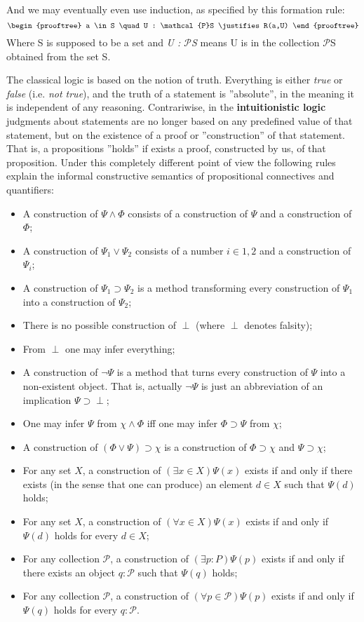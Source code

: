 And we may eventually even use induction, as specified by this formation rule:
\[
	\begin{prooftree}
		a \in S \quad
		U : \mathcal{P}S
		\justifies
		R(a,U)
	\end{prooftree}
\]
Where S is supposed to be a set and \textit{U : $\mathcal{P}$S} means U is in the collection $\mathcal{P}$S obtained from the set S.

The classical logic is based on the notion of truth. Everything is either \textit{true} or \textit{false} (i.e. \textit{not true}), and the truth of a statement is ''absolute'', in the meaning it is independent of any reasoning. Contrariwise, in the \textbf{intuitionistic logic} judgments about statements are no longer based on any predefined value of that statement, but on the existence of a proof or ''construction'' of that statement. That is, a propositions ''holds'' if exists a proof, constructed by us, of that proposition. Under this completely different point of view the following rules explain the informal constructive semantics of propositional connectives and quantifiers:
\begin{itemize}
	\item A construction of $\Psi\wedge\Phi$ consists of a construction of $\Psi$ and a construction of $\Phi$;
	\item A construction of $\Psi_{1} \vee \Psi_{2}$ consists of a number $i \in {1, 2}$ and a construction of $\Psi_{i}$;
	\item A construction of $\Psi_{1} \supset \Psi_{2}$ is a method transforming every construction of $\Psi_{1}$ into a construction of $\Psi_{2}$;
	\item There is no possible construction of $\perp$ (where $\perp$ denotes falsity);
	\item From $\perp$ one may infer everything;
	\item A construction of $\neg\Psi$ is a method that turns every construction of $\Psi$ into a non-existent object. That is, actually $\neg\Psi$ is just an abbreviation of an implication $\Psi \supset \perp$;
	\item One may infer $\Psi$ from $\chi\wedge\Phi$ iff one may infer $\Phi \supset \Psi$ from $\chi$;
	\item A construction of $(\Phi \vee \Psi) \supset \chi$ is a construction of $\Phi \supset \chi$ and $\Psi \supset \chi$;
	\item For any set $X$, a construction of $(\exists x \in X)\Psi(x)$ exists if and only if there exists (in the sense that one can produce) an element $d \in X$ such that $\Psi(d)$ holds;
	\item For any set $X$, a construction of $(\forall x \in X)\Psi(x)$ exists if and only if $\Psi(d)$ holds for every $d \in X$;
	\item For any collection $\mathcal{P}$, a construction of $(\exists p : P)\Psi(p)$ exists if and only if there exists an object $q : \mathcal{P}$ such that $\Psi(q)$ holds;
	\item For any collection $\mathcal{P}$, a construction of $(\forall p \in \mathcal{P})\Psi(p)$ exists if and only if $\Psi(q)$ holds for every $q : \mathcal{P}$.
\end{itemize}
